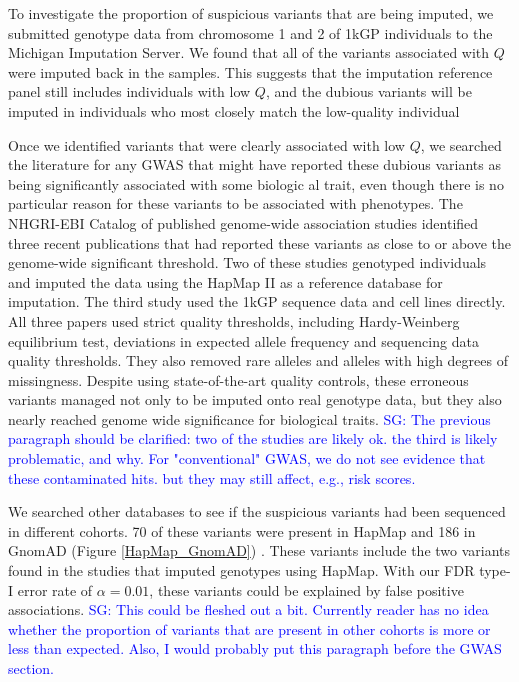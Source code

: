 \documentclass[9pt,lineno]{elife}
\newcommand{\sgcomment}[1]{\textcolor{blue}{SG: #1}}
\begin{document}
To investigate the proportion of suspicious variants that are being imputed, we submitted genotype data from chromosome 1 and 2 of 1kGP individuals to the Michigan Imputation Server.
We found that all of the variants associated with $Q$ were imputed back in the samples. 
This suggests that the imputation reference panel still includes individuals with low $Q$, and the dubious variants will be imputed in individuals who most closely match the low-quality individual

Once we identified variants that were clearly associated with low $Q$, we searched the literature for any GWAS that might have reported these dubious variants as being significantly associated with some biologic al trait, even though there is no particular reason for these variants to be associated with phenotypes.
The NHGRI-EBI Catalog of published genome-wide association studies identified three recent publications that had reported these variants as close to or above the genome-wide significant threshold.
Two of these studies genotyped individuals and imputed the data using the HapMap II as a reference  database for imputation.
The third study used the 1kGP sequence data and cell lines directly.
All three papers used strict quality thresholds, including Hardy-Weinberg equilibrium test, deviations in expected allele frequency and sequencing data quality thresholds.
They also removed rare alleles and alleles with high degrees of missingness.
Despite using state-of-the-art quality controls, these erroneous variants managed not only to be imputed onto real genotype data, but they also nearly reached genome wide significance for biological traits.  \sgcomment{The previous paragraph should be clarified: two of the studies are likely ok. the third is likely problematic, and why. For "conventional" GWAS, we do not see evidence that these contaminated hits. but they may still affect, e.g., risk scores.}


We searched other databases to see if the suspicious variants had been sequenced in different cohorts.
70 of these variants were present in HapMap and 186 in GnomAD (Figure \ref{HapMap_GnomAD}) \citep{HapMap2005,Lek2016}.
These variants include the two variants found in the studies that imputed genotypes using HapMap.
With our FDR type-I error rate of $\alpha = 0.01$, these variants could be explained by false positive associations. \sgcomment{This could be fleshed out a bit. Currently reader has no idea whether the proportion of variants that are present in other cohorts is more or less than expected. Also, I would probably put this paragraph before the GWAS section.}
\end{document}
